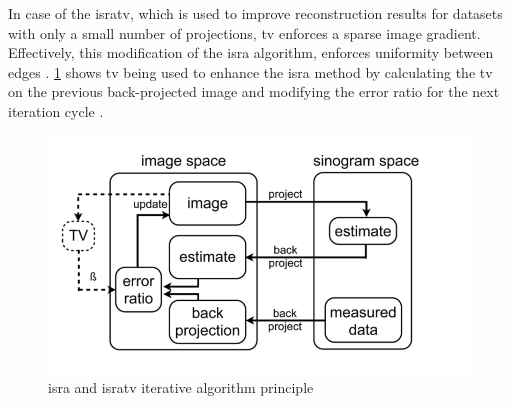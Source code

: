 In case of the \gls{isratv}, which is used to improve reconstruction results for datasets with only a small number of projections,
\acrfull{tv} enforces a sparse image gradient.
Effectively, this modification of the \gls{isra} algorithm, enforces uniformity between edges \cite{vandeghinsteLowDoseMicroCTImaging2013}.
\cref{fig:isra} shows \acrshort{tv} being used to enhance the \gls{isra} method by
calculating the \acrshort{tv} on the previous back-projected image and modifying the error ratio for the next iteration cycle \cite{vandeghinsteLowDoseMicroCTImaging2013}.
\begin{figure}[h]
	\centerline{
		\includegraphics[scale=0.5]{images/isra.png}}
	\caption{\gls{isra} and \gls{isratv} iterative algorithm principle \cite{vandeghinsteLowDoseMicroCTImaging2013}}
	\label{fig:isra}
\end{figure}

